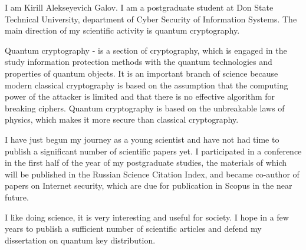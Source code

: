 


I am Kirill Alekseyevich Galov. I am a postgraduate student at Don State Technical University, department of Cyber Security of Information Systems. The main direction of my scientific activity is quantum cryptography.

Quantum cryptography - is a section of cryptography, which is engaged in the study information protection methods with the quantum technologies and properties of quantum objects. It is an important branch of science because modern classical cryptography is based on the assumption that the computing power of the attacker is limited and that there is no effective algorithm for breaking ciphers. Quantum cryptography is based on the unbreakable laws of physics, which makes it more secure than classical cryptography.

I have just begun my journey as a young scientist and have not had time to publish a significant number of scientific papers yet. I participated in a conference in the first half of the year of my postgraduate studies, the materials of which will be published in the Russian Science Citation Index, and became co-author of papers on Internet security, which are due for publication in Scopus in the near future.

I like doing science, it is very interesting and useful for society. I hope in a few years to publish a sufficient number of scientific articles and defend my dissertation on quantum key distribution.


